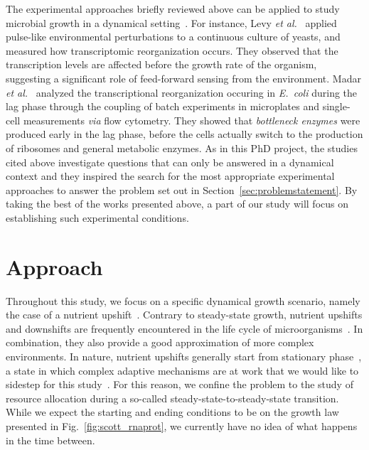 The experimental approaches briefly reviewed above can be applied to study microbial growth in a dynamical setting~\cite{levy_strategy_2007,levy_coordination_2009,madar_promoter_2013,ehrenberg_mediumdependent_2012}.
For instance, Levy \textit{et al.}~\cite{levy_strategy_2007,levy_coordination_2009} applied pulse-like environmental perturbations to a continuous culture of yeasts, and measured how transcriptomic reorganization occurs.
They observed that the transcription levels are affected before the growth rate of the organism, suggesting a significant role of feed-forward sensing from the environment.
Madar \textit{et al.}~\cite{madar_promoter_2013} analyzed the transcriptional reorganization occuring in \textit{E.~coli} during the lag phase through the coupling of batch experiments in microplates and single-cell measurements \textit{via} flow cytometry.
They showed that \textit{bottleneck enzymes} were produced early in the lag phase, before the cells actually switch to the production of ribosomes and general metabolic enzymes.
As in this PhD project, the studies cited above investigate questions that can only be answered in a dynamical context and they inspired the search for the most appropriate experimental approaches to answer the problem set out in Section~\ref{sec:problemstatement}.
By taking the best of the works presented above, a part of our study will focus on establishing such experimental conditions.

\section{Approach}
\label{sec:approach}

Throughout this study, we focus on a specific dynamical growth scenario, namely the case of a nutrient upshift~\cite{ehrenberg_mediumdependent_2012,kjeldgaard_kinetics_1961,schaechter_patterns_1961,johnsen_control_1977}.
Contrary to steady-state growth, nutrient upshifts and downshifts are frequently encountered in the life cycle of microorganisms~\cite{schaechter_microbe_2006,mcarthur_microbial_2006,menge_nitrogen_2012,hobbie_microbes_2013}.
In combination, they also provide a good approximation of more complex environments.
In nature, nutrient upshifts generally start from stationary phase~\cite{mcarthur_microbial_2006,menge_nitrogen_2012,hobbie_microbes_2013}, a state in which complex adaptive mechanisms are at work that we would like to sidestep for this study~\cite{stragier_molecular_1996,gonzalez-pastor_cannibalism:_2011,ng_damage_1962,dufrenne_effect_1997,shaw_effect_1967,mcmeekin_predictive_2002,cheroutre-vialette_application_2002}.
For this reason, we confine the problem to the study of resource allocation during a so-called steady-state-to-steady-state transition.
While we expect the starting and ending conditions to be on the growth law presented in Fig.~\ref{fig:scott_rnaprot}, we currently have no idea of what happens in the time between.

